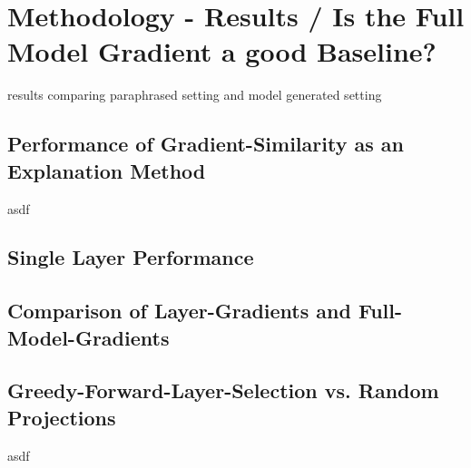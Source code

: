 \chapter{Methodology - Results / Is the Full Model Gradient a good Baseline?}
results comparing paraphrased setting and model generated setting


\section{Performance of Gradient-Similarity as an Explanation Method}
asdf

\section{Single Layer Performance}

\section{Comparison of Layer-Gradients and Full-Model-Gradients}

\section{Greedy-Forward-Layer-Selection vs. Random Projections}
asdf